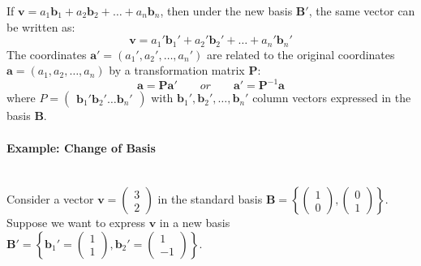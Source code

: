 \documentclass[]{article}
\begin{document}
	If $\mathbf{v} = a_1 \mathbf{b}_1 + a_2 \mathbf{b}_2 + \dots + a_n \mathbf{b}_n$, then under the new basis $\mathbf{B}'$, the same vector can be written as:
	$$
	\mathbf{v} = a_1' \mathbf{b}_1' + a_2' \mathbf{b}_2' + \dots + a_n' \mathbf{b}_n'
	$$
	The coordinates $\mathbf{a'} = (a_1', a_2', \dots, a_n')$ are related to the original coordinates $\mathbf{a} = (a_1, a_2, \dots, a_n)$ by a transformation matrix $\mathbf{P}$:
	$$
	\mathbf{a} = \mathbf{P} \mathbf{a'}
	\qquad \textit{or} \qquad
	\mathbf{a'} = \mathbf{P}^{-1} \mathbf{a}
	$$
	where $P = \begin{pmatrix} \mathbf{b}_1' \mathbf{b}_2' \dots \mathbf{b}_n' \end{pmatrix}$ with $\mathbf{b}_1', \mathbf{b}_2', \dots, \mathbf{b}_n'$ column vectors expressed in the basis $\mathbf{B}$.
	
	\paragraph{Example: Change of Basis}
	\noindent\\
	Consider a vector $\mathbf{v} = \begin{pmatrix} 3 \\ 2 \end{pmatrix}$ in the standard basis $\mathbf{B} = \left\{ \begin{pmatrix} 1 \\ 0 \end{pmatrix}, \begin{pmatrix} 0 \\ 1 \end{pmatrix} \right\}$.
	\\
	Suppose we want to express $\mathbf{v}$ in a new basis $\mathbf{B}' = \left\{ \mathbf{b}_1' = \begin{pmatrix} 1 \\ 1 \end{pmatrix}, \mathbf{b}_2' = \begin{pmatrix} 1 \\ -1 \end{pmatrix} \right\}$.
	
\end{document}
